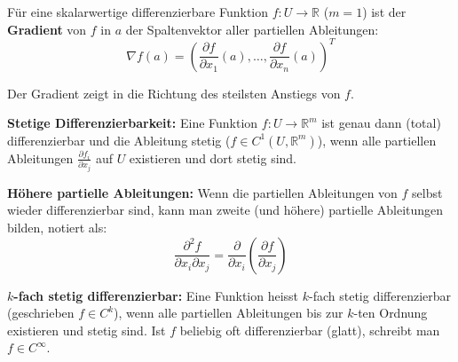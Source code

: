 \begin{definition}
    Für eine skalarwertige differenzierbare Funktion $f: U \to \mathbb{R}$ ($m=1$) ist der \textbf{Gradient} von $f$ in $a$ der Spaltenvektor aller partiellen Ableitungen:
    $$ \nabla f(a) = \left( \frac{\partial f}{\partial x_1}(a), \dots, \frac{\partial f}{\partial x_n}(a) \right)^T $$
\end{definition}

\begin{remark}
    Der Gradient zeigt in die Richtung des steilsten Anstiegs von $f$.
\end{remark}

\begin{theorem}
    \textbf{Stetige Differenzierbarkeit:} Eine Funktion $f: U \to \mathbb{R}^m$ ist genau dann (total) differenzierbar und die Ableitung stetig ($f \in C^1(U, \mathbb{R}^m)$), wenn alle partiellen Ableitungen $\frac{\partial f_i}{\partial x_j}$ auf $U$ existieren und dort stetig sind.
\end{theorem}

\begin{remark}
    \textbf{Höhere partielle Ableitungen:} Wenn die partiellen Ableitungen von $f$ selbst wieder differenzierbar sind, kann man zweite (und höhere) partielle Ableitungen bilden, notiert als:
    $$ \frac{\partial^2 f}{\partial x_i \partial x_j} = \frac{\partial}{\partial x_i} \left( \frac{\partial f}{\partial x_j} \right) $$
\end{remark}

\begin{definition}
    \textbf{$k$-fach stetig differenzierbar:} Eine Funktion heisst $k$-fach stetig differenzierbar (geschrieben $f \in C^k$), wenn alle partiellen Ableitungen bis zur $k$-ten Ordnung existieren und stetig sind. Ist $f$ beliebig oft differenzierbar (glatt), schreibt man $f \in C^\infty$.
\end{definition}

